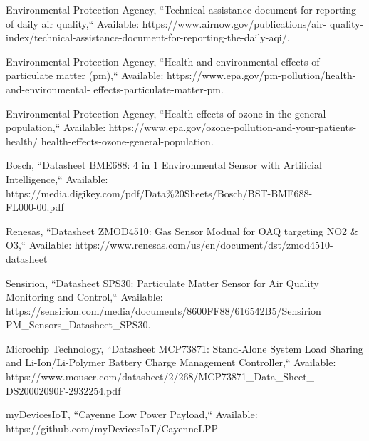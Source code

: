 \documentclass[conference]{IEEEtran}
\begin{document}
\begin{thebibliography}{00}
 Environmental Protection Agency, ``Technical assistance document for reporting of daily air quality,`` Available: https://www.airnow.gov/publications/air- quality-index/technical-assistance-document-for-reporting-the-daily-aqi/.

 Environmental Protection Agency, ``Health and environmental effects of particulate matter (pm),`` Available: https://www.epa.gov/pm-pollution/health-and-environmental- effects-particulate-matter-pm.

 Environmental Protection Agency, ``Health effects of ozone in the general population,`` Available: https://www.epa.gov/ozone-pollution-and-your-patients-health/
health-effects-ozone-general-population.

 Bosch, ``Datasheet BME688: 4 in 1 Environmental Sensor with Artificial Intelligence,`` Available: https://media.digikey.com/pdf/Data\%20Sheets/Bosch/BST-BME688- \\ FL000-00.pdf

 Renesas, ``Datasheet ZMOD4510: Gas Sensor Modual for OAQ targeting NO2 & O3,`` Available: https://www.renesas.com/us/en/document/dst/zmod4510-datasheet

 Sensirion, ``Datasheet SPS30: Particulate Matter Sensor for Air Quality Monitoring and Control,`` Available: https://sensirion.com/media/documents/8600FF88/616542B5/Sensirion\_ \\
PM\_Sensors\_Datasheet\_SPS30.

 Microchip Technology, ``Datasheet MCP73871: Stand-Alone System Load Sharing and Li-Ion/Li-Polymer Battery Charge
Management Controller,`` Available: https://www.mouser.com/datasheet/2/268/MCP73871\_Data\_Sheet\_ \\
DS20002090F-2932254.pdf



 myDevicesIoT, ``Cayenne Low Power Payload,`` Available: https://github.com/myDevicesIoT/CayenneLPP

\end{thebibliography}
\end{document}
